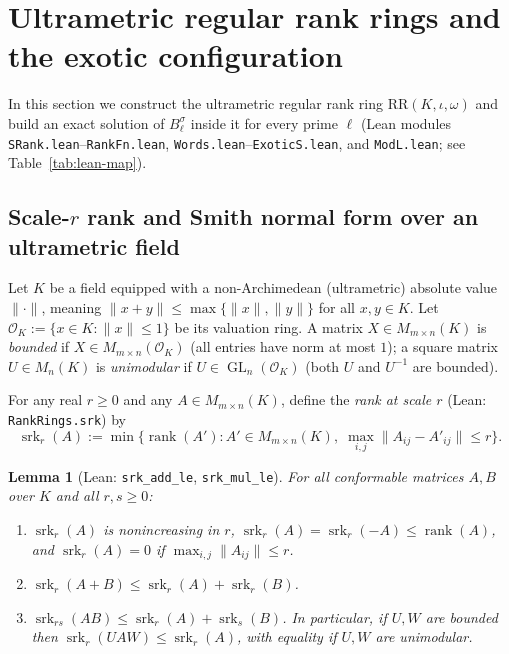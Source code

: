 \documentclass[11pt]{article}
\newtheorem{lemma}[theorem]{Lemma}
\theoremstyle{definition}
\theoremstyle{remark}
\numberwithin{equation}{section}
\DeclareMathOperator{\srk}{srk}
\DeclareMathOperator{\rank}{rank}
\DeclareMathOperator{\GL}{GL}
\newcommand{\RR}{\mathrm{RR}}
\newcommand{\OO}{\mathcal{O}}
\newcommand{\1}{\mathbf{1}}
\newcommand{\code}[1]{{\normalfont\small\texttt{#1}}}
\begin{document}
\section{Ultrametric regular rank rings and the exotic configuration}
\label{sec:ultrametric}

In this section we construct the ultrametric regular rank ring $\RR(K, \iota, \omega)$ and build an exact solution of $B_\ell^\sigma$ inside it for every prime $\ell$ (Lean modules \code{SRank.lean}--\code{RankFn.lean}, \code{Words.lean}--\code{ExoticS.lean}, and \code{ModL.lean}; see Table~\ref{tab:lean-map}).

\subsection{Scale-\texorpdfstring{$r$}{r} rank and Smith normal form over an ultrametric field}

Let $K$ be a field equipped with a non-Archimedean (ultrametric) absolute value $\|\cdot\|$, meaning $\|x + y\| \le \max\{\|x\|, \|y\|\}$ for all $x, y \in K$. Let $\OO_K := \{x \in K : \|x\| \le 1\}$ be its valuation ring. A matrix $X \in M_{m \times n}(K)$ is \emph{bounded} if $X \in M_{m \times n}(\OO_K)$ (all entries have norm at most $1$); a square matrix $U \in M_n(K)$ is \emph{unimodular} if $U \in \GL_n(\OO_K)$ (both $U$ and $U^{-1}$ are bounded).

For any real $r \ge 0$ and any $A \in M_{m \times n}(K)$, define the \emph{rank at scale $r$} (Lean: \code{RankRings.srk}) by
\[
\srk_r(A) := \min\bigl\{\rank(A') : A' \in M_{m \times n}(K),\; \max_{i,j} \|A_{ij} - A'_{ij}\| \le r\bigr\}.
\]

\begin{lemma}[Lean: \code{srk\_add\_le}, \code{srk\_mul\_le}]
\label{lem:srk-basic}
For all conformable matrices $A, B$ over $K$ and all $r, s \ge 0$:
\begin{enumerate}[label=\textup{(\alph*)},leftmargin=2.2em]
\item $\srk_r(A)$ is nonincreasing in $r$, $\srk_r(A) = \srk_r(-A) \le \rank(A)$, and $\srk_r(A) = 0$ if $\max_{i,j}\|A_{ij}\| \le r$.
\item $\srk_r(A + B) \le \srk_r(A) + \srk_r(B)$.
\item $\srk_{rs}(AB) \le \srk_r(A) + \srk_s(B)$. In particular, if $U, W$ are bounded then $\srk_r(UAW) \le \srk_r(A)$, with equality if $U, W$ are unimodular.
\end{enumerate}
\end{lemma}
\end{document}
